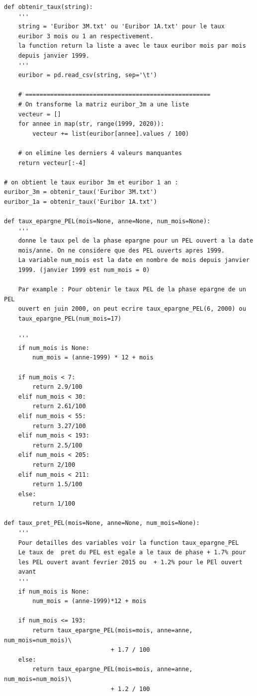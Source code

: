 \documentclass[12pt, a4paper]{book}
\begin{document}
{\begin{small}
\begin{verbatim}
def obtenir_taux(string):
    '''
    string = 'Euribor 3M.txt' ou 'Euribor 1A.txt' pour le taux
    euribor 3 mois ou 1 an respectivement.
    la function return la liste a avec le taux euribor mois par mois
    depuis janvier 1999.
    '''
    euribor = pd.read_csv(string, sep='\t')

    # ====================================================
    # On transforme la matriz euribor_3m a une liste
    vecteur = []
    for annee in map(str, range(1999, 2020)):
        vecteur += list(euribor[annee].values / 100)

    # on elimine les derniers 4 valeurs manquantes
    return vecteur[:-4]

# on obtient le taux euribor 3m et euribor 1 an :
euribor_3m = obtenir_taux('Euribor 3M.txt')
euribor_1a = obtenir_taux('Euribor 1A.txt')

def taux_epargne_PEL(mois=None, anne=None, num_mois=None):
    '''
    donne le taux pel de la phase epargne pour un PEL ouvert a la date
    mois/anne. On ne considere que des PEL ouverts apres 1999.
    La variable num_mois est la date en nombre de mois depuis janvier
    1999. (janvier 1999 est num_mois = 0)

    Par example : Pour obtenir le taux PEL de la phase epargne de un PEL
    ouvert en juin 2000, on peut ecrire taux_epargne_PEL(6, 2000) ou
    taux_epargne_PEL(num_mois=17)

    '''
    if num_mois is None:
        num_mois = (anne-1999) * 12 + mois

    if num_mois < 7:
        return 2.9/100
    elif num_mois < 30:
        return 2.61/100
    elif num_mois < 55:
        return 3.27/100
    elif num_mois < 193:
        return 2.5/100
    elif num_mois < 205:
        return 2/100
    elif num_mois < 211:
        return 1.5/100
    else:
        return 1/100

def taux_pret_PEL(mois=None, anne=None, num_mois=None):
    '''
    Pour detailles des variables voir la function taux_epargne_PEL
    Le taux de  pret du PEL est egale a le taux de phase + 1.7% pour
    les PEL ouvert avant fevrier 2015 ou  + 1.2% pour le PEl ouvert
    avant
    '''
    if num_mois is None:
        num_mois = (anne-1999)*12 + mois

    if num_mois <= 193:
        return taux_epargne_PEL(mois=mois, anne=anne, num_mois=num_mois)\
                              + 1.7 / 100
    else:
        return taux_epargne_PEL(mois=mois, anne=anne, num_mois=num_mois)\
                              + 1.2 / 100


\end{verbatim}
\end{small}}
\end{document}
